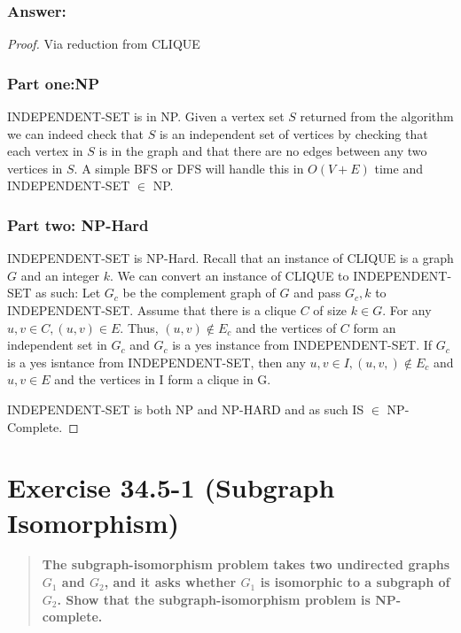 \documentclass[titlepage]{article}\usepackage[]{graphicx}\usepackage[]{color}
\begin{document}
  \subsubsection{Answer:}
  \begin{proof} Via reduction from CLIQUE
    \subsubsection{Part one:NP}
    INDEPENDENT-SET is in NP. Given a vertex set $S$ returned from the
    algorithm we can indeed check that $S$ is an independent set of vertices
    by checking that each vertex in $S$ is in the graph and that there are no
    edges between any two vertices in $S$. A simple BFS or DFS will handle this
    in $O(V+E)$ time and INDEPENDENT-SET $\in $ NP.
    \subsubsection{Part two: NP-Hard}
    INDEPENDENT-SET is NP-Hard. Recall that an instance of CLIQUE is a graph
    $G$ and an integer $k$. We can convert an instance of CLIQUE to
    INDEPENDENT-SET as such: Let $G_c$ be the complement graph of $G$ and pass
    $G_c,k$ to INDEPENDENT-SET.
    Assume that there is a clique $C$ of size $k \in G$. For any $u,v \in C,
    (u,v) \in E$. Thus, $(u,v) \notin E_c$ and the vertices of $C$ form an
    independent set in $G_c$ and $G_c$ is a yes instance from INDEPENDENT-SET.
    If $G_c$ is a yes isntance from INDEPENDENT-SET, then any $u,v \in I,
    (u,v,) \notin E_c$ and $u,v \in E$ and the vertices in I form a clique in
    G. 


    INDEPENDENT-SET is both NP and NP-HARD and as such IS $\in$ NP-Complete.
  \end{proof}








\section{Exercise 34.5-1 (Subgraph Isomorphism)}
  \begin{quote}
    \textbf{The subgraph-isomorphism problem takes two undirected graphs $G_1$ and
    $G_2$, and it asks whether $G_1$ is isomorphic to a subgraph of $G_2$. Show that the
    subgraph-isomorphism problem is NP-complete.}
  \end{quote}
\end{document}
